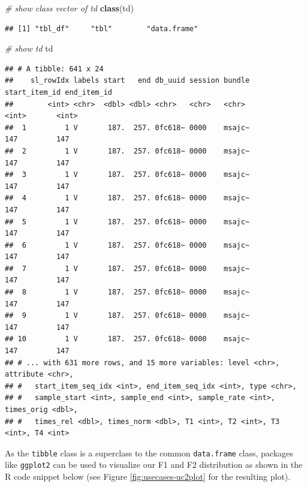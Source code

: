 \documentclass[]{book}
\newenvironment{Shaded}{\begin{snugshade}}{\end{snugshade}}
\newcommand{\CommentTok}[1]{\textcolor[rgb]{0.56,0.35,0.01}{\textit{#1}}}
\newcommand{\KeywordTok}[1]{\textcolor[rgb]{0.13,0.29,0.53}{\textbf{#1}}}
\newcommand{\NormalTok}[1]{#1}
\begin{document}
\begin{Shaded}
\begin{Highlighting}[]
\CommentTok{# show class vector of td}
\KeywordTok{class}\NormalTok{(td)}
\end{Highlighting}
\end{Shaded}

\begin{verbatim}
## [1] "tbl_df"     "tbl"        "data.frame"
\end{verbatim}

\begin{Shaded}
\begin{Highlighting}[]
\CommentTok{# show td}
\NormalTok{td}
\end{Highlighting}
\end{Shaded}

\begin{verbatim}
## # A tibble: 641 x 24
##    sl_rowIdx labels start   end db_uuid session bundle start_item_id end_item_id
##        <int> <chr>  <dbl> <dbl> <chr>   <chr>   <chr>          <int>       <int>
##  1         1 V       187.  257. 0fc618~ 0000    msajc~           147         147
##  2         1 V       187.  257. 0fc618~ 0000    msajc~           147         147
##  3         1 V       187.  257. 0fc618~ 0000    msajc~           147         147
##  4         1 V       187.  257. 0fc618~ 0000    msajc~           147         147
##  5         1 V       187.  257. 0fc618~ 0000    msajc~           147         147
##  6         1 V       187.  257. 0fc618~ 0000    msajc~           147         147
##  7         1 V       187.  257. 0fc618~ 0000    msajc~           147         147
##  8         1 V       187.  257. 0fc618~ 0000    msajc~           147         147
##  9         1 V       187.  257. 0fc618~ 0000    msajc~           147         147
## 10         1 V       187.  257. 0fc618~ 0000    msajc~           147         147
## # ... with 631 more rows, and 15 more variables: level <chr>, attribute <chr>,
## #   start_item_seq_idx <int>, end_item_seq_idx <int>, type <chr>,
## #   sample_start <int>, sample_end <int>, sample_rate <int>, times_orig <dbl>,
## #   times_rel <dbl>, times_norm <dbl>, T1 <int>, T2 <int>, T3 <int>, T4 <int>
\end{verbatim}

As the \texttt{tibble} class is a superclass to the common \texttt{data.frame} class, packages like \texttt{ggplot2} can be used to visualize our F1 and F2 distribution as shown in the R code snippet below (see Figure \ref{fig:usecases-uc2plot} for the resulting plot).
\end{document}
